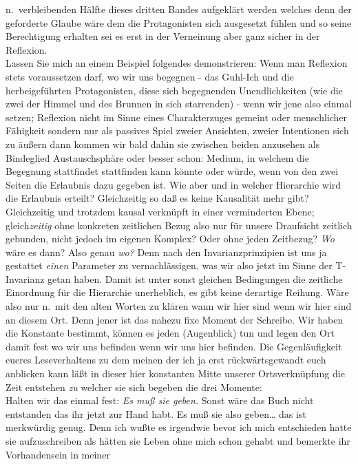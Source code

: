 \documentclass[
]{article}
\begin{document}
n.~verbleibenden Hälfte dieses dritten Bandes aufgeklärt werden welches
denn der geforderte Glaube wäre dem die Protagonisten sich ausgesetzt
fühlen und so seine Berechtigung erhalten sei es erst in der Verneinung
aber ganz sicher in der Reflexion.\\
Lassen Sie mich an einem Beispiel folgendes demonstrieren: Wenn man
Reflexion stets voraussetzen darf, wo wir uns begegnen - das Guhl-Ich
und die herbeigeführten Protagonisten, diese sich begegnenden
Unendlichkeiten (wie die zwei der Himmel und des Brunnen in sich
starrenden) - wenn wir jene also einmal setzen; Reflexion nicht im Sinne
eines Charakterzuges gemeint oder menschlicher Fähigkeit sondern nur als
passives Spiel zweier Ansichten, zweier Intentionen sich zu äußern dann
kommen wir bald dahin sie zwischen beiden anzusehen als Bindeglied
Austauschsphäre oder besser schon: Medium, in welchem die Begegnung
stattfindet stattfinden kann könnte oder würde, wenn von den zwei Seiten
die Erlaubnis dazu gegeben ist. Wie aber und in welcher Hierarchie wird
die Erlaubnis erteilt? Gleichzeitig so daß es keine Kausalität mehr
gibt? Gleichzeitig und trotzdem kausal verknüpft in einer verminderten
Ebene; gleich\emph{zeitig} ohne konkreten zeitlichen Bezug also nur für
unsere Draufsicht zeitlich gebunden, nicht jedoch im eigenen Komplex?
Oder ohne jeden Zeitbezug? \emph{Wo} wäre es dann? Also genau \emph{wo?
}Denn nach den Invarianzprinzipien ist uns ja gestattet \emph{einen}
Parameter zu vernachlässigen, was wir also jetzt im Sinne der
T-Invarianz getan haben. Damit ist unter sonst gleichen Bedingungen die
zeitliche Einordnung für die Hierarchie unerheblich, es gibt keine
derartige Reihung. Wäre also nur n.~mit den alten Worten zu klären wann
wir hier sind wenn wir hier sind an diesem Ort. Denn jener ist das
nahezu fixe Moment der Schreibe. Wir haben die Konstante bestimmt,
können es jeden (Augenblick) tun und legen den Ort damit fest wo wir uns
befinden wenn wir uns hier befinden. Die Gegenläufigkeit eueres
Leseverhaltens zu dem meinen der ich ja erst rückwärtsgewandt euch
anblicken kann läßt in dieser hier konstanten Mitte unserer
Ortsverknüpfung die Zeit entstehen \emph{zu} welcher sie sich begeben
die drei Momente:\\
Halten wir das einmal fest: \emph{Es muß sie geben.} Sonst wäre das Buch
nicht entstanden das ihr jetzt zur Hand habt. Es muß sie also
geben\ldots{} das ist merkwürdig genug. Denn ich wußte es irgendwie
bevor ich mich entschieden hatte sie aufzuschreiben als hätten sie Leben
ohne mich schon gehabt und bemerkte ihr Vorhandensein in meiner
\end{document}
